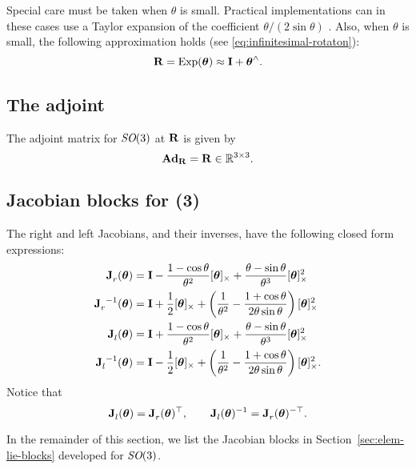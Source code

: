 Special care must be taken when $\theta$ is small.
Practical implementations can in these cases use a Taylor expansion of the coefficient $\theta / (2 \sin \theta)$ \cite{Eade2013LieTransformations}.
Also, when $\theta$ is small, the following approximation holds (see \eqref{eq:infinitesimal-rotaton}):
\begin{equation} \label{eq:SO3-Exp-approx}
  {\boldsymbol{\mathbf{R}}} = \operatorname*{Exp}({\boldsymbol{\mathbf{\theta}}}) \approx {\boldsymbol{\mathbf{I}}} + {\boldsymbol{\mathbf{\theta}}}^\wedge.
\end{equation}

\subsection{The adjoint}
The adjoint matrix for $\textit{SO}(3)$ at ${\boldsymbol{\mathbf{R}}}$ is given by
\begin{equation}
  \boldsymbol{\mathbf{Ad}}_{\boldsymbol{\mathbf{R}}} = {\boldsymbol{\mathbf{R}}}  \in {\mathbb R}^{3 \times 3}.
\end{equation}

\subsection{Jacobian blocks for \SO(3)} \label{sec:Jacobians-SO3}
The right and left Jacobians, and their inverses, have the following closed form expressions: 
\begin{align}
{{\boldsymbol{\mathbf{J}}}^{}_{r}}({\boldsymbol{\mathbf{\theta}}}) &= {\boldsymbol{\mathbf{I}}} - \frac{1-\cos\theta}{\theta^2}[{\boldsymbol{\mathbf{\theta}}}]_\times + \frac{\theta-\sin\theta}{\theta^3}[{\boldsymbol{\mathbf{\theta}}}]_\times^2\\
{{\boldsymbol{\mathbf{J}}}^{}_{r}}^{-1}({\boldsymbol{\mathbf{\theta}}}) &= {\boldsymbol{\mathbf{I}}} + \frac{1}{2}[{\boldsymbol{\mathbf{\theta}}}]_\times + \left(\frac{1}{\theta^2} - \frac{1+\cos\theta}{2\theta\sin\theta}\right)[{\boldsymbol{\mathbf{\theta}}}]_\times^2 \\
{{\boldsymbol{\mathbf{J}}}^{}_{l}}({\boldsymbol{\mathbf{\theta}}}) &= {\boldsymbol{\mathbf{I}}} + \frac{1-\cos\theta}{\theta^2}[{\boldsymbol{\mathbf{\theta}}}]_\times + \frac{\theta-\sin\theta}{\theta^3}[{\boldsymbol{\mathbf{\theta}}}]_\times^2 \label{eq:SO3-left-jac}\\
{{\boldsymbol{\mathbf{J}}}^{}_{l}}^{-1}({\boldsymbol{\mathbf{\theta}}}) &= {\boldsymbol{\mathbf{I}}} - \frac{1}{2}[{\boldsymbol{\mathbf{\theta}}}]_\times + \left(\frac{1}{\theta^2} - \frac{1+\cos\theta}{2\theta\sin\theta}\right)[{\boldsymbol{\mathbf{\theta}}}]_\times^2.
\end{align}
Notice that
\begin{equation}
  {{\boldsymbol{\mathbf{J}}}^{}_{l}}({\boldsymbol{\mathbf{\theta}}}) = {{\boldsymbol{\mathbf{J}}}^{}_{r}}({\boldsymbol{\mathbf{\theta}}})^{\top}, \quad\quad {{\boldsymbol{\mathbf{J}}}^{}_{l}}({\boldsymbol{\mathbf{\theta}}})^{-1} = {{\boldsymbol{\mathbf{J}}}^{}_{r}}({\boldsymbol{\mathbf{\theta}}})^{-\top}.
\end{equation}

In the remainder of this section, we list the Jacobian blocks in Section~\ref{sec:elem-lie-blocks} developed for $\textit{SO}(3)$.

